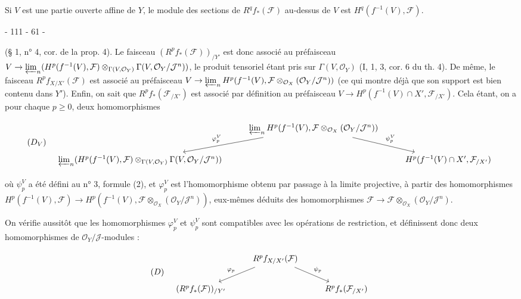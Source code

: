 Si $V$ est une partie ouverte affine de $Y$, le module des sections de $R^q f_* (\mathcal{F})$ au-dessus de $V$ est $H^q(f^{-1}(V), \mathcal{F})$.

\newpage


- 111 - 61 -

(§ 1, n° 4, cor. de la prop. 4). Le faisceau $(R^p f_* (\mathcal{F}))_{/Y'}$ est donc associé au préfaisceau $V \to \varprojlim_n (H^p (f^{-1} (V), \mathcal{F}) \otimes_{\Gamma (V, \mathcal{O}_Y)} \Gamma (V, \mathcal{O}_Y / \mathcal{J}^n))$, le produit tensoriel étant pris sur $\Gamma (V, \mathcal{O}_Y)$ (I, 1, 3, cor. 6 du th. 4). De même, le faisceau $R^p f_{X/X'} (\mathcal{F})$ est associé au préfaisceau $V \to \varprojlim_n H^p (f^{-1} (V), \mathcal{F} \otimes_{\mathcal{O}_X} (\mathcal{O}_Y / \mathcal{J}^n))$ (ce qui montre déjà que son support est bien contenu dans $Y'$). Enfin, on sait que $R^p f_* (\mathcal{F}_{/X'})$ est associé par définition au préfaisceau $V \to H^p (f^{-1} (V) \cap X', \mathcal{F}_{/X'})$. Cela étant, on a pour chaque $p \ge 0$, deux homomorphismes

$$(D_V) \quad \begin{tikzcd} & \varprojlim_n H^p (f^{-1} (V), \mathcal{F} \otimes_{\mathcal{O}_X} (\mathcal{O}_Y / \mathcal{J}^n)) \arrow[ld, "\varphi_p^V"'] \arrow[rd, "\psi_p^V"] & \\ \varprojlim_n (H^p (f^{-1} (V), \mathcal{F}) \otimes_{\Gamma (V, \mathcal{O}_Y)} \Gamma (V, \mathcal{O}_Y / \mathcal{J}^n)) & & H^p (f^{-1} (V) \cap X', \mathcal{F}_{/X'}) \end{tikzcd}$$

où $\psi_p^V$ a été défini au n° 3, formule (2), et $\varphi_p^V$ est l'homomorphisme obtenu par passage à la limite projective, à partir des homomorphismes $H^p (f^{-1} (V), \mathcal{F}) \to H^p (f^{-1} (V), \mathcal{F} \otimes_{\mathcal{O}_X} (\mathcal{O}_Y / \mathcal{J}^n))$, eux-mêmes déduits des homomorphismes $\mathcal{F} \to \mathcal{F} \otimes_{\mathcal{O}_X} (\mathcal{O}_Y / \mathcal{J}^n)$.

On vérifie aussitôt que les homomorphismes $\varphi_p^V$ et $\psi_p^V$ sont compatibles avec les opérations de restriction, et définissent donc deux homomorphismes de $\mathcal{O}_Y / \mathcal{J}$-modules :

$$(D) \quad \begin{tikzcd} & R^p f_{X/X'} (\mathcal{F}) \arrow[ld, "\varphi_p"'] \arrow[rd, "\psi_p"] & \\ (R^p f_* (\mathcal{F}))_{/Y'} & & R^p f_* (\mathcal{F}_{/X'}) \end{tikzcd}$$

